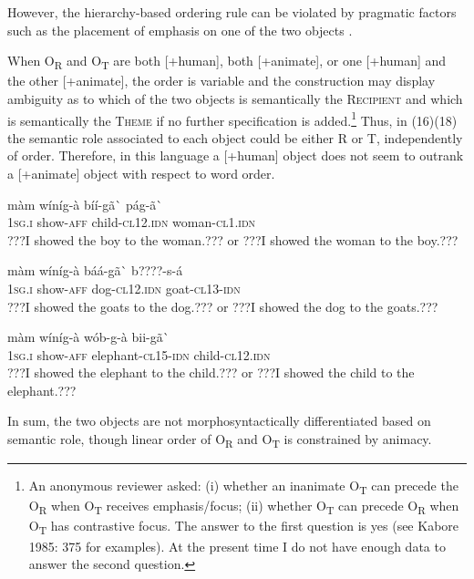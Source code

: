\documentclass[output=paper]{langsci/langscibook}
\begin{document}
However, the hierarchy-based ordering rule can be violated by pragmatic factors such as the placement of emphasis on one of the two objects \citep[375]{Kabore1985}.

When O\textsubscript{R} and O\textsubscript{T} are both [+human], both [+animate], or one [+human] and the other [+animate],  the order is variable and the construction may display ambiguity as to which of the two objects is semantically the \textsc{Recipient} and which is semantically the \textsc{Theme} if no further specification is added.\footnote{ An anonymous reviewer asked: (i) whether an inanimate O\textsubscript{T} can precede the O\textsubscript{R} when O\textsubscript{T} receives emphasis/focus; (ii) whether O\textsubscript{T }can precede O\textsubscript{R} when O\textsubscript{T} has contrastive focus. The answer to the first question is yes (see Kabore 1985: 375 for examples). At the present time I do not have enough data to answer the second question.} Thus, in (16)(18) the semantic role associated to each object could be either R or T, independently of order. Therefore, in this language a [+human] object does not seem to outrank a [+animate] object with respect to word order.


\ea \gll 
\label{bkm:Ref424143119}màm    wíníg-à    bíí-gã\`{ }      pág-ã\`{ }
\\
%
\textsc{1sg.i  }  show-\textsc{aff}    child-\textsc{cl12.idn}  woman-\textsc{cl1.idn}
\\\glt
???I showed the boy to the woman.??? or ???I showed the woman to the boy.???
\z


\ea \gll 
màm    wíníg-à    báá-gã\`{ }    b????-s-á
\\
%
\textsc{1sg.i  }  show-\textsc{aff}    dog-\textsc{cl12.idn}  goat-\textsc{cl13-idn}
\\\glt
???I showed the goats to the dog.??? or ???I showed the dog to the goats.???  
\z


\ea \gll 
\label{bkm:Ref424143137}màm    wíníg-à    wób-g-à    bii-gã\`{ }
\\
%
\textsc{1sg.i  }  show-\textsc{aff}    elephant-\textsc{cl15-idn}  child-\textsc{cl12.idn}
\\\glt
???I showed the elephant to the child.??? or ???I showed the child to the elephant.???
\z

In sum, the two objects are not morphosyntactically differentiated based on semantic role, though linear order of O\textsubscript{R} and O\textsubscript{T }is constrained by animacy.
\end{document}
